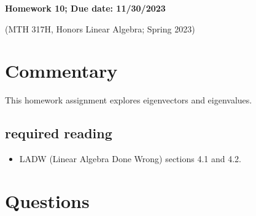 \documentclass[12pt]{article}
\begin{document}
	\begin{LARGE}
	\begin{center}
		
		

		
	
	\textbf{Homework 10; Due date: 11/30/2023}
	

	(MTH 317H, Honors Linear Algebra;  Spring 2023)
	\end{center}
	\end{LARGE}
	\vspace{0.15in}
	
	
	

	
\section{Commentary}

This homework assignment explores eigenvectors and eigenvalues.

\subsection{required reading}

\begin{itemize}
	\item LADW (Linear Algebra Done Wrong) sections 4.1 and 4.2.
\end{itemize}




\section{Questions}

\vspace{.5cm}
\end{document}
